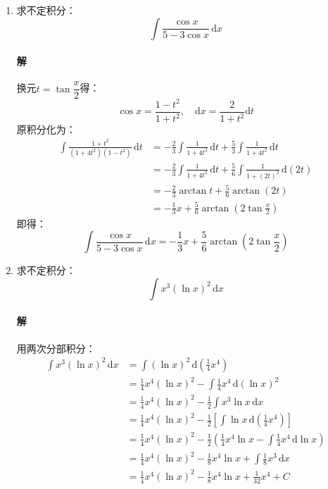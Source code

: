 \documentclass[fontset=none,openany,a4paper]{ctexbook}
\begin{document}
\begin{enumerate}
    \item 求不定积分：
    \[
    \int \frac{\cos x}{5-3\cos x}\,\mathrm{d}x
    \]

    \paragraph{解}

    换元$t=\tan\dfrac{x}{2}$得：
    \[
    \cos x = \frac{1-t^2}{1+t^2},\quad \mathrm{d}x = \frac{2}{1+t^2}\mathrm{d}t
    \]
    原积分化为：
    \begin{align*}
        \int \frac{1+t^2}{(1+4t^2)(1-t^2)}\,\mathrm{d}t
        &= -\frac{2}{3}\int \frac{1}{1+4t^2}\,\mathrm{d}t + \frac{5}{3}\int \frac{1}{1+4t^2}\,\mathrm{d}t \\
        &= -\frac{2}{3}\int \frac{1}{1+4t^2}\,\mathrm{d}t + \frac{5}{6}\int \frac{1}{1+(2t)^2}\,\mathrm{d}(2t) \\
        &= -\frac{2}{3}\arctan t + \frac{5}{6}\arctan(2t) \\
        &= -\frac{1}{3}x + \frac{5}{6}\arctan\left(2\tan\frac{x}{2}\right)
    \end{align*}
    即得：
    \[
    \int \frac{\cos x}{5-3\cos x}\,\mathrm{d}x = -\frac{1}{3}x + \frac{5}{6}\arctan\left(2\tan\frac{x}{2}\right)
    \]

    \item 求不定积分：
    \[
    \int x^3(\ln x)^2\,\mathrm{d}x
    \]

    \paragraph{解}

    用两次分部积分：
    \begin{align*}
        \int x^3(\ln x)^2\,\mathrm{d}x
        &= \int (\ln x)^2\,\mathrm{d}\left(\frac{1}{4}x^4\right) \\
        &= \frac{1}{4}x^4(\ln x)^2 - \int \frac{1}{4}x^4\,\mathrm{d}(\ln x)^2 \\
        &= \frac{1}{4}x^4(\ln x)^2 - \frac{1}{2}\int x^3\ln x\,\mathrm{d}x \\
        &= \frac{1}{4}x^4(\ln x)^2 - \frac{1}{2}\left[\int \ln x\,\mathrm{d}\left(\frac{1}{4}x^4\right)\right] \\
        &= \frac{1}{4}x^4(\ln x)^2 - \frac{1}{2}\left(\frac{1}{4}x^4\ln x - \int \frac{1}{4}x^4\,\mathrm{d}\ln x\right) \\
        &= \frac{1}{4}x^4(\ln x)^2 - \frac{1}{8}x^4\ln x + \int \frac{1}{8}x^3\,\mathrm{d}x \\
        &= \frac{1}{4}x^4(\ln x)^2 - \frac{1}{8}x^4\ln x + \frac{1}{32}x^4 + C
    \end{align*}


\end{enumerate}
\end{document}
